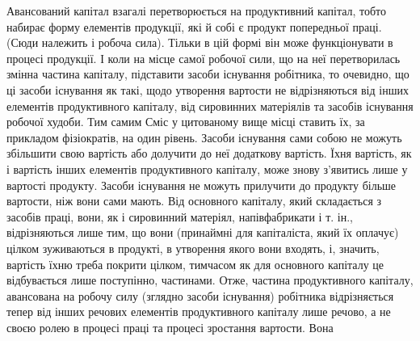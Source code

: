 Авансований капітал взагалі перетворюється на продуктивний капітал,
тобто набирає форму елементів продукції, які й собі є продукт попередньої
праці. (Сюди належить і робоча сила). Тільки в цій формі він
може функціонувати в процесі продукції. І коли на місце самої робочої
сили, що на неї перетворилась змінна частина капіталу, підставити засоби
існування робітника, то очевидно, що ці засоби існування як такі,
щодо утворення вартости не відрізняються від інших елементів продуктивного
капіталу, від сировинних матеріялів та засобів існування робочої
худоби. Тим самим Сміс у цитованому вище місці ставить їх, за прикладом
фізіократів, на один рівень. Засоби існування сами собою не можуть
збільшити свою вартість або долучити до неї додаткову вартість. Їхня
вартість, як і вартість інших елементів продуктивного капіталу, може
знову з’явитись лише у вартості продукту. Засоби існування не можуть
прилучити до продукту більше вартости, ніж вони сами мають. Від основного
капіталу, який складається з засобів праці, вони, як і сировинний
матеріял, напівфабрикати і т. ін., відрізняються лише тим, що вони
(принаймні для капіталіста, який їх оплачує) цілком зуживаються в продукті,
в утворення якого вони входять, і, значить, вартість їхню треба
покрити цілком, тимчасом як для основного капіталу це відбувається
лише поступінно, частинами. Отже, частина продуктивного капіталу,
авансована на робочу силу (зглядно засоби існування) робітника відрізняється
тепер від інших речових елементів продуктивного капіталу лише речово, а
не своєю ролею в процесі праці та процесі зростання вартости. Вона
\parbreak{}  %
